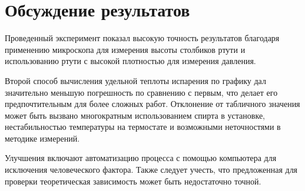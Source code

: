 \documentclass[a4paper,12pt]{article} %
\begin{document}
\newpage

\section{Обсуждение результатов}

Проведенный эксперимент показал высокую точность результатов благодаря применению микроскопа для измерения высоты столбиков ртути и использованию ртути с высокой плотностью для измерения давления.

Второй способ вычисления удельной теплоты испарения по графику дал значительно меньшую погрешность по сравнению с первым, что делает его предпочтительным для более сложных работ. Отклонение от табличного значения может быть вызвано многократным использованием спирта в установке, нестабильностью температуры на термостате и возможными неточностями в методике измерений.

Улучшения включают автоматизацию процесса с помощью компьютера для исключения человеческого фактора. Также следует учесть, что предложенная для проверки теоретическая зависимость может быть недостаточно точной.
\end{document}
